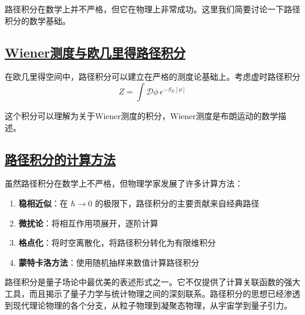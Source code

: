 路径积分在数学上并不严格，但它在物理上非常成功。这里我们简要讨论一下路径积分的数学基础。

\subsection{\protect\hyperlink{:}{Wiener测度与欧几里得路径积分}}

在欧几里得空间中，路径积分可以建立在严格的测度论基础上。考虑虚时路径积分
\begin{equation}
    Z = \int \mathcal{D}\phi \, e^{-S_E[\phi]}
\end{equation}

这个积分可以理解为关于Wiener测度的积分，Wiener测度是布朗运动的数学描述。

\subsection{\protect\hyperlink{:}{路径积分的计算方法}}

虽然路径积分在数学上不严格，但物理学家发展了许多计算方法：
\begin{enumerate}
    \item \textbf{稳相近似}：在 $\hbar \to 0$ 的极限下，路径积分的主要贡献来自经典路径
    \item \textbf{微扰论}：将相互作用项展开，逐阶计算
    \item \textbf{格点化}：将时空离散化，将路径积分转化为有限维积分
    \item \textbf{蒙特卡洛方法}：使用随机抽样来数值计算路径积分
\end{enumerate}

\begin{remark}
    路径积分是量子场论中最优美的表述形式之一。它不仅提供了计算关联函数的强大工具，而且揭示了量子力学与统计物理之间的深刻联系。路径积分的思想已经渗透到现代理论物理的各个分支，从粒子物理到凝聚态物理，从宇宙学到量子引力。
\end{remark}
